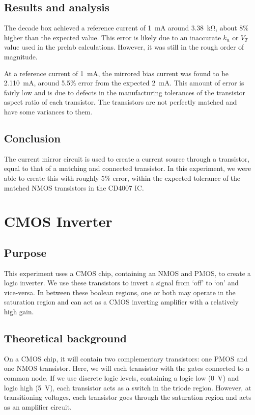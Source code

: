\documentclass{report}
\begin{document}
\subsection{Results and analysis}
The decade box achieved a reference current of \SI{1}{\mA} around \SI{3.38}{\kohm}, about 8\% higher than the expected value. This error is likely due to an inaccurate $k_n$ or $V_T$ value used in the prelab calculations. However, it was still in the rough order of magnitude.

At a reference current of \SI{1}{\mA}, the mirrored bias current was found to be \SI{2.110}{\mA}, around 5.5\% error from the expected \SI{2}{\mA}. This amount of error is fairly low and is due to defects in the manufacturing tolerances of the transistor aspect ratio of each transistor. The transistors are not perfectly matched and have some variances to them.
\subsection{Conclusion}
The current mirror circuit is used to create a current source through a transistor, equal to that of a matching and connected transistor. In this experiment, we were able to create this with roughly 5\% error, within the expected tolerance of the matched NMOS transistors in the CD4007 IC.

\pagebreak
\section{CMOS Inverter}

\subsection{Purpose}
This experiment uses a CMOS chip, containing an NMOS and PMOS, to create a logic inverter. We use these transistors to invert a signal from `off' to `on' and vice-versa. In between these boolean regions, one or both may operate in the saturation region and can act as a CMOS inverting amplifier with a relatively high gain. 

\subsection{Theoretical background}
On a CMOS chip, it will contain two complementary transistors: one PMOS and one NMOS transistor. Here, we will each transistor with the gates connected to a common node. If we use discrete logic levels, containing a logic low (\SI{0}{\V}) and logic high (\SI{5}{\V}), each transistor acts as a switch in the triode region. However, at transitioning voltages, each transistor goes through the saturation region and acts as an amplifier circuit.
\end{document}
